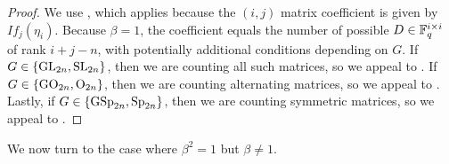 \begin{proof}
	We use , which applies because the $(i,j)$ matrix coefficient is given by $If_j(\eta_i)$. Because $\beta=1$, the coefficient equals the number of possible $D\in\mathbb F_q^{i\times i}$ of rank $i+j-n$, with potentially additional conditions depending on $G$. If $G\in\{\mathrm{GL}_{2n},\mathrm{SL}_{2n}\}$, then we are counting all such matrices, so we appeal to \cite[Theorem~7.1.5]{hach-gf}. If $G\in\{\mathrm{GO}_{2n},\mathrm{O}_{2n}\}$, then we are counting alternating matrices, so we appeal to \cite[Theorem~7.5.5]{hach-gf}. Lastly, if $G\in\{\mathrm{GSp}_{2n},\mathrm{Sp}_{2n}\}$, then we are counting symmetric matrices, so we appeal to \cite[Theorem~7.5.2]{hach-gf}.
\end{proof}
We now turn to the case where $\beta^2=1$ but $\beta\ne1$.
